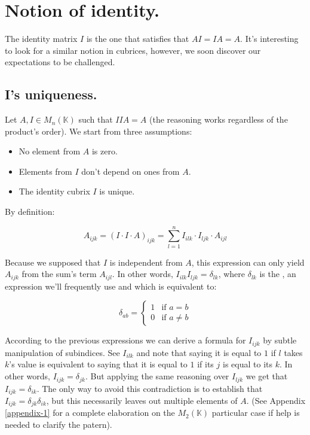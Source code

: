 \section{Notion of identity.} \label{identity}

The identity matrix $I$ is the one that satisfies that $AI = IA = A$. It's interesting to look for a similar notion in cubrices, however, we soon discover our expectations to be challenged.

\subsection{I's uniqueness.} \label{identity-unique}

Let $A, I \in M_{n} (\mathbb{K})$ such that $IIA = A$ (the reasoning works regardless of the product's order). We start from three assumptions:

\begin{itemize}
	\item No element from $A$ is zero.
	\item Elements from $I$ don't depend on ones from $A$.
	\item The identity cubrix $I$ is unique.
\end{itemize}

By definition:

$$A_{ijk} = (I \cdot I \cdot A)_{ijk} = \sum\limits_{l=1}^{n} I_{ilk} \cdot I_{ljk} \cdot A_{ijl}$$

Because we supposed that $I$ is independent from $A$, this expression can only yield $A_{ijk}$ from the sum's term $A_{ijl}$. In other words, $I_{ilk} I_{ljk} = \delta_{lk}$, where $\delta_{lk}$ is the , an expression we'll frequently use and which is equivalent to:

\begin{equation}
	\delta_{ab} =
	\begin{cases}
		1 & \text{if } a = b \\
		0 & \text{if } a \neq b
	\end{cases}
\end{equation}

According to the previous expressions we can derive a formula for $I_{ijk}$ by subtle manipulation of subindices. See $I_{ilk}$ and note that saying it is equal to $1$ if $l$ takes $k$'s value is equivalent to saying that it is equal to $1$ if its $j$ is equal to its $k$. In other words, $I_{ijk} = \delta_{jk}$. But applying the same reasoning over $I_{ljk}$ we get that $I_{ijk} = \delta_{ik}$. The only way to avoid this contradiction is to establish that $I_{ijk} = \delta_{jk} \delta_{ik}$, but this necessarily leaves out multiple elements of $A$. (See Appendix \ref{appendix-1} for a complete elaboration on the $M_2 (\mathbb{K})$ particular case if help is needed to clarify the patern).

